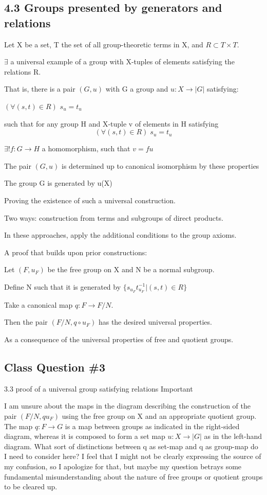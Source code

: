 \documentclass[12pt]{article}
\begin{document}
\subsection{4.3 Groups presented by generators and relations}

Let X be a set, T the set of all group-theoretic terms in X, and $R \subset T \times T$.

$\exists$ a universal example of a group with X-tuples of elements satisfying the relations R.

\noindent
That is, there is a pair $(G, u)$ with G a group and $u: X \to |G|$ satisfying:

$(\forall (s, t) \in R)$ $s_u = t_u$

such that for any group H and X-tuple v of elements in H satisfying $$(\forall (s, t) \in R) \; s_u = t_u$$

$\exists ! f: G \to H$ a homomorphism, such that $v = fu$

The pair $(G, u)$ is determined up to canonical isomorphism by these properties

The group G is generated by u(X)

\noindent
Proving the existence of such a universal construction.

Two ways: construction from terms and subgroups of direct products.

In these approaches, apply the additional conditions to the group axioms.

\noindent
A proof that builds upon prior constructions:

Let $(F, u_F)$ be the free group on X and N be a normal subgroup.

Define N such that it is generated by $\{s_{u_F}t_{u_F}^{-1} | (s, t) \in R\}$

Take a canonical map $q: F \to F \slash N$.

Then the pair $(F\slash N, q \circ u_F)$ has the desired universal properties.

As a consequence of the universal properties of free and quotient groups.

\subsection{Class Question \#3}

3.3 proof of a universal group satisfying relations
Important

I am unsure about the maps in the diagram describing the construction of the pair $(F\slash N, qu_F)$ using the free group on X and an appropriate quotient group.  The map $q: F \to G$ is a map between groups as indicated in the right-sided diagram, whereas it is composed to form a set map $u : X \to |G|$ as in the left-hand diagram.  What sort of distinctions between q as set-map and q as group-map do I need to consider here?  I feel that I might not be clearly expressing the source of my confusion, so I apologize for that, but maybe my question betrays some fundamental misunderstanding about the nature of free groups or quotient groups to be cleared up.
\end{document}
